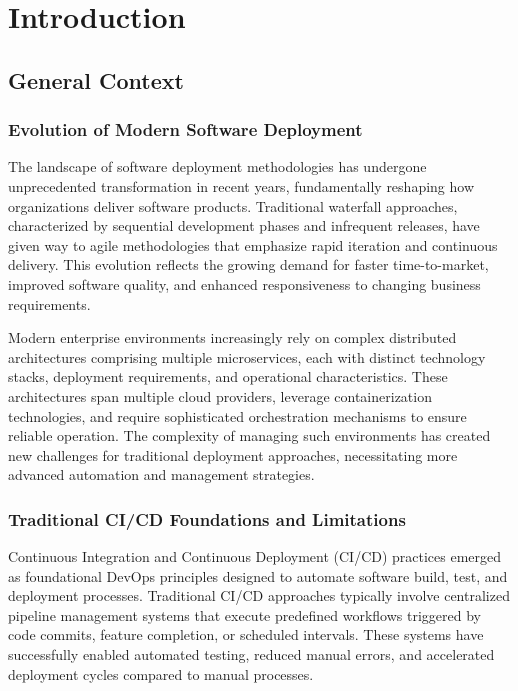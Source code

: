 \chapter{Introduction}

\section{General Context}

\subsection{Evolution of Modern Software Deployment}
The landscape of software deployment methodologies has undergone unprecedented transformation in recent years, fundamentally reshaping how organizations deliver software products. Traditional waterfall approaches, characterized by sequential development phases and infrequent releases, have given way to agile methodologies that emphasize rapid iteration and continuous delivery. This evolution reflects the growing demand for faster time-to-market, improved software quality, and enhanced responsiveness to changing business requirements.

Modern enterprise environments increasingly rely on complex distributed architectures comprising multiple microservices, each with distinct technology stacks, deployment requirements, and operational characteristics. These architectures span multiple cloud providers, leverage containerization technologies, and require sophisticated orchestration mechanisms to ensure reliable operation. The complexity of managing such environments has created new challenges for traditional deployment approaches, necessitating more advanced automation and management strategies.

\subsection{Traditional CI/CD Foundations and Limitations}
Continuous Integration and Continuous Deployment (CI/CD) practices emerged as foundational DevOps principles designed to automate software build, test, and deployment processes. Traditional CI/CD approaches typically involve centralized pipeline management systems that execute predefined workflows triggered by code commits, feature completion, or scheduled intervals. These systems have successfully enabled automated testing, reduced manual errors, and accelerated deployment cycles compared to manual processes.

